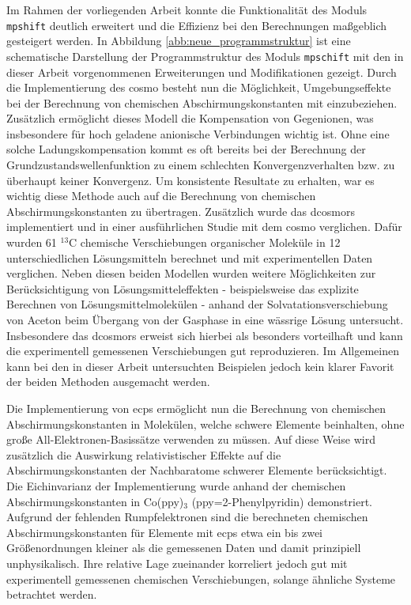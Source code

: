 Im Rahmen der vorliegenden Arbeit konnte die Funktionalität des Moduls \texttt{mpshift} deutlich erweitert und die Effizienz bei den Berechnungen maßgeblich gesteigert werden. In Abbildung \ref{abb:neue_programmstruktur} ist eine schematische Darstellung der Programmstruktur des Moduls \texttt{mpschift} mit den in dieser Arbeit vorgenommenen Erweiterungen und Modifikationen gezeigt. Durch die Implementierung des \acf{cosmo} besteht nun die Möglichkeit, Umgebungseffekte bei der Berechnung von chemischen Abschirmungskonstanten mit einzubeziehen. Zusätzlich ermöglicht dieses Modell die Kompensation von Gegenionen, was insbesondere für hoch geladene anionische Verbindungen wichtig ist. Ohne eine solche Ladungskompensation kommt es oft bereits bei der Berechnung der Grundzustandswellenfunktion zu einem schlechten Konvergenzverhalten bzw. zu überhaupt keiner Konvergenz. Um konsistente Resultate zu erhalten, war es wichtig diese Methode auch auf die Berechnung von chemischen Abschirmungskonstanten zu übertragen. Zusätzlich wurde das \acf{dcosmors} implementiert und in einer ausführlichen Studie mit dem \ac{cosmo} verglichen. Dafür wurden 61 $^{13}$C chemische Verschiebungen organischer Moleküle in 12 unterschiedlichen Lösungsmitteln berechnet und mit experimentellen Daten verglichen. Neben diesen beiden Modellen wurden weitere Möglichkeiten zur Berücksichtigung von Lösungsmitteleffekten - beispielsweise das explizite Berechnen von Lösungsmittelmolekülen - anhand der Solvatationsverschiebung von Aceton beim Übergang von der Gasphase in eine wässrige Lösung untersucht. Insbesondere das \ac{dcosmors} erweist sich hierbei als besonders vorteilhaft und kann die experimentell gemessenen Verschiebungen gut reproduzieren. Im Allgemeinen kann bei den in dieser Arbeit untersuchten Beispielen jedoch kein klarer Favorit der beiden Methoden ausgemacht werden.

Die Implementierung von \acfp{ecp} ermöglicht nun die Berechnung von chemischen Abschirmungskonstanten in Molekülen, welche schwere Elemente beinhalten, ohne große All-Elektronen-Basissätze verwenden zu müssen. Auf diese Weise wird zusätzlich die Auswirkung relativistischer Effekte auf die Abschirmungskonstanten der Nachbaratome schwerer Elemente berücksichtigt. Die Eichinvarianz der Implementierung wurde anhand der chemischen Abschirmungskonstanten in Co(ppy)$_3$ (ppy=2-Phenylpyridin) demonstriert. Aufgrund der fehlenden Rumpfelektronen sind die berechneten chemischen Abschirmungskonstanten für Elemente mit \acp{ecp} etwa ein bis zwei Größenordnungen kleiner als die gemessenen Daten und damit prinzipiell unphysikalisch. Ihre relative Lage zueinander korreliert jedoch gut mit experimentell gemessenen chemischen Verschiebungen, solange ähnliche Systeme betrachtet werden.


